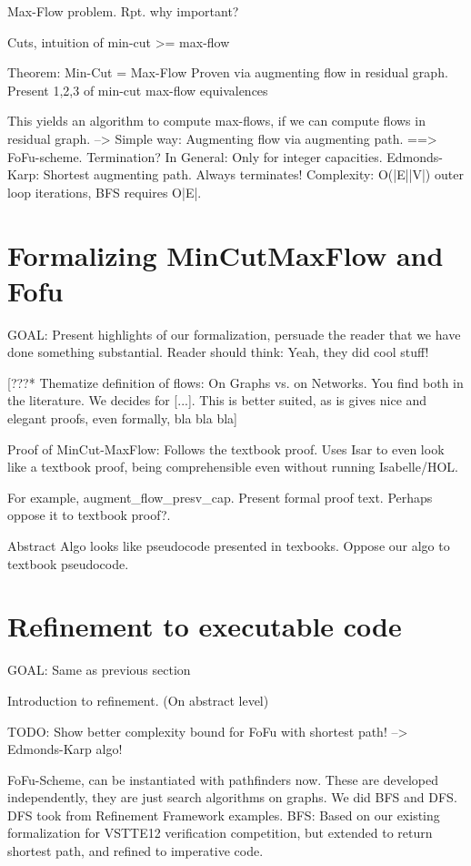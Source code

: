 \documentclass{llncs}
\begin{document}
  Max-Flow problem. 
    Rpt. why important?
  
  Cuts, intuition of min-cut >= max-flow
  
  Theorem: Min-Cut = Max-Flow
  Proven via augmenting flow in residual graph. 
    Present 1,2,3 of min-cut max-flow equivalences
  
  This yields an algorithm to compute max-flows, if we can compute flows in residual graph.
    --> Simple way: Augmenting flow via augmenting path. ==> FoFu-scheme. 
      Termination? In General: Only for integer capacities.
      Edmonds-Karp: Shortest augmenting path. Always terminates! Complexity: O(|E||V|) outer loop iterations, BFS requires O|E|.
  


\section{Formalizing MinCutMaxFlow and Fofu}
  GOAL: Present highlights of our formalization, persuade the reader that we have done something substantial.
    Reader should think: Yeah, they did cool stuff!

  [???* Thematize definition of flows: On Graphs vs. on Networks. You find both in the literature. 
      We decides for [...]. This is better suited, as is gives nice and elegant proofs, even formally, bla bla bla]
    
  Proof of MinCut-MaxFlow: Follows the textbook proof.
    Uses Isar to even look like a textbook proof, being comprehensible even without running
      Isabelle/HOL.
      
    For example, augment_flow_presv_cap.
      Present formal proof text. Perhaps oppose it to textbook proof?.
    
  Abstract Algo looks like pseudocode presented in texbooks.
    Oppose our algo to textbook pseudocode.
    
    
\section{Refinement to executable code}
  GOAL: Same as previous section
  
  Introduction to refinement. (On abstract level)

  TODO: Show better complexity bound for FoFu with shortest path! --> Edmonds-Karp algo!
 
  
  FoFu-Scheme, can be instantiated with pathfinders now.
  These are developed independently, they are just search algorithms on graphs.
    We did BFS and DFS.
      DFS took from Refinement Framework examples.
      BFS: Based on our existing formalization for VSTTE12 verification competition, 
        but extended to return shortest path, and refined to imperative code.
    
\end{document}
